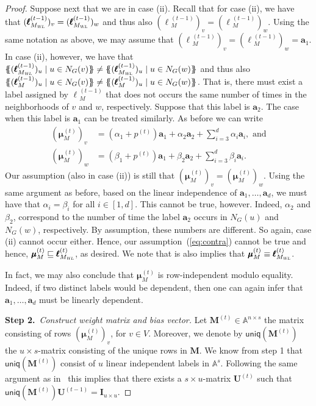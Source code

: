 \begin{proof}
Suppose next that we are in case (ii). Recall that for case (ii), we have that
$(\pmb{\ell}{}_{M_{\textsl{WL}}}^{(t-1)})_v=(\pmb{\ell}{}_{M_{\textsl{WL}}}^{(t-1)})_w$ and thus also  $(\pmb{\ell}{}_M^{(t-1)})_v=(\pmb{\ell}{}_M^{(t-1)})_w$.
	Using the same notation as above, we may assume that $(\pmb{\ell}{}_M^{(t-1)})_v=(\pmb{\ell}{}_M^{(t-1)})_w=\mathbf{a}_1$. In case (ii), however, we have that
	$
	\ldbl (\pmb{\ell}{}_{M_{\textsl{WL}}}^{(t-1)})_{u} \st u \in N_G(v) \rdbl\neq
	\ldbl (\pmb{\ell}{}_{M_{\textsl{WL}}}^{(t-1)})_{u} \st u \in N_G(w) \rdbl
	$ and thus also 
	$
	\ldbl (\pmb{\ell}{}_{M}^{(t-1)})_{u} \st u \in N_G(v) \rdbl\neq
	\ldbl (\pmb{\ell}{}_{M}^{(t-1)})_{u} \st u \in N_G(w) \rdbl
	$.
	That is, there must exist a label assigned by $\pmb{\ell}{}_M^{(t-1)}$ that does not occurs the same number of times in the neighborhoods of $v$ and $w$, respectively. Suppose that this label is $\mathbf{a}_2$. The case when this label is $\mathbf{a}_1$ can be treated similarly. As before we can write
	\begin{align*}
	(\pmb{\mu}_M^{(t)})_v&=(\alpha_1+p^{(t)})\mathbf{a}_1+ \alpha_2\mathbf{a}_2+ \sum_{i=3}^d \alpha_i\mathbf{a}_i, \text{ and}\\
	(\pmb{\mu}_M^{(t)})_w&=(\beta_1+p^{(t)})\mathbf{a}_1+ \beta_2\mathbf{a}_2+ \sum_{i=3}^d \beta_i\mathbf{a}_i.
	\end{align*}
	Our assumption (also in case (ii)) is still that $(\pmb{\mu}_M^{(t)})_v=(\pmb{\mu}_M^{(t)})_w$. Using the same argument as before, based on  the linear independence of $\mathbf{a}_1,\ldots,\mathbf{a}_d$, we must have that 
	$\alpha_i=\beta_i$ for all $i\in [1,d]$.
This cannot be true, however. Indeed,
 $\alpha_2$ and $\beta_2$, correspond to the number of time the label $\mathbf{a}_2$  occurs in $N_G(u)$ and $N_G(w)$, respectively. By assumption, these numbers are different. So again, case (ii) cannot occur either. Hence, our assumption~(\ref{eq:contra}) cannot be true and hence, $\pmb{\mu}_M^{(t)}\sqsubseteq \pmb{\ell}_{M_{\textsl{WL}}}^{(t)}$, as desired. We note that is also implies that $\pmb{\mu}_M^{(t)}\equiv \pmb{\ell}_{M_{\textsl{WL}}}^{(t)}$. 
 
In fact, we may also conclude that $\pmb{\mu}_M^{(t)}$ is row-independent modulo equality. Indeed, if two distinct labels would be dependent, then one can again infer that $\mathbf{a}_1,\ldots,\mathbf{a}_d$ must be linearly dependent.
 
\smallskip
\noindent
\textbf{Step 2.\, }\textit{Construct weight matrix and bias vector.}
Let $\mathbf{M}^{(t)}\in\mathbb{A}^{n\times s}$ the matrix consisting of rows $(\pmb{\mu}_M^{(t)})_v$, for $v\in V$.
Moreover, we denote by $\mathsf{uniq}(\mathbf{M}^{(t)})$ the $u\times s$-matrix consisting of the unique rows in $\mathbf{M}$. We know from step 1 that
$\mathsf{uniq}(\mathbf{M}^{(t)})$ consist of $u$ linear independent labels in $\mathbb{A}^s$. Following the same argument as in~\cite{grohewl} this implies that there exists a $s\times u$-matrix $\mathbf{U}^{(t)}$ such that $\mathsf{uniq}(\mathbf{M}^{(t)})\mathbf{U}^{(t-1)}=\mathbf{I}_{u\times u}$. 




\end{proof}
